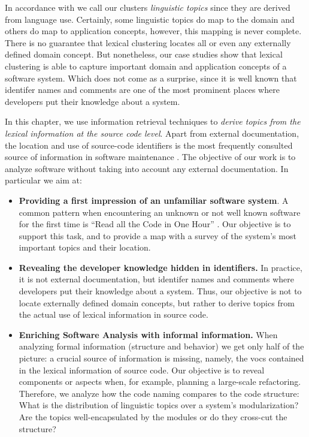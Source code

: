 In accordance with \cite{Bigg89c} we call our clusters \emph{linguistic topics} since they are derived from language use. Certainly, some linguistic topics do map to the domain and others do map to application concepts, however, this mapping is never complete. There is no guarantee that lexical clustering locates all or even any externally defined domain concept. But nonetheless, our case studies show that lexical clustering is able to capture important domain and application concepts of a software system. Which does not come as a surprise, since it is well known that identifer names and comments are one of the most prominent places where developers put their knowledge about a system.

In this chapter, we use information retrieval techniques to \emph{derive topics from the lexical information at the source code level}. Apart from external documentation, the location and use of source-code identifiers is the most frequently consulted source of information in software maintenance \cite{Kosk04a}. The objective of our work is to analyze software without taking into account any external documentation. In particular we aim at:

\begin{itemize}
  \item \textbf{Providing a first impression of an unfamiliar software system}. A common pattern when encountering an unknown or not well known software for the first time is ``Read all the Code in One Hour'' \cite{Deme02a}. Our objective is to support this task, and to provide a map with a survey of the system's most important topics and their location.
  \item \textbf{Revealing the developer knowledge hidden in identifiers.} In practice, it is not external documentation, but identifer names and comments where developers put their knowledge about a system. Thus, our objective is not to locate externally defined domain concepts, but rather to derive topics from the actual use of lexical information in source code.
  \item \textbf{Enriching Software Analysis with informal information.} When analyzing formal information (\eg structure and behavior) we get only half of the picture: a crucial source of information is missing, namely, the vocs contained in the lexical information of source code. Our objective is to reveal components or aspects when, for example, planning a large-scale refactoring. Therefore, we analyze how the code naming compares to the code structure: What is the distribution of linguistic topics over a system's modularization? Are the topics well-encapsulated by the modules or do they cross-cut the structure?
\end{itemize}


